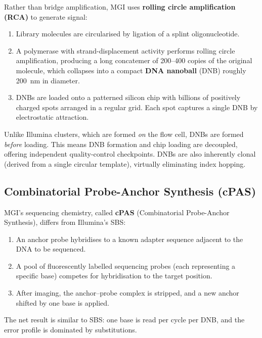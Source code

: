 Rather than bridge amplification, MGI uses \textbf{rolling circle amplification (RCA)} to generate signal:

\begin{enumerate}[nosep]
  \item Library molecules are circularised by ligation of a splint oligonucleotide.
  \item A polymerase with strand-displacement activity performs rolling circle amplification, producing a long concatemer of 200--400 copies of the original molecule, which collapses into a compact \textbf{DNA nanoball} (DNB) roughly 200~nm in diameter.
  \item DNBs are loaded onto a patterned silicon chip with billions of positively charged spots arranged in a regular grid. Each spot captures a single DNB by electrostatic attraction.
\end{enumerate}

\begin{keyconcept}[title={DNA Nanoballs vs Clusters}]
Unlike Illumina clusters, which are formed \emph{on} the flow cell, DNBs are formed \emph{before} loading. This means DNB formation and chip loading are decoupled, offering independent quality-control checkpoints. DNBs are also inherently clonal (derived from a single circular template), virtually eliminating index hopping.
\end{keyconcept}

\subsection{Combinatorial Probe-Anchor Synthesis (cPAS)}

MGI's sequencing chemistry, called \textbf{cPAS} (Combinatorial Probe-Anchor Synthesis), differs from Illumina's \gls{SBS}:

\begin{enumerate}[nosep]
  \item An anchor probe hybridises to a known adapter sequence adjacent to the DNA to be sequenced.
  \item A pool of fluorescently labelled sequencing probes (each representing a specific base) competes for hybridisation to the target position.
  \item After imaging, the anchor--probe complex is stripped, and a new anchor shifted by one base is applied.
\end{enumerate}

The net result is similar to \gls{SBS}: one base is read per cycle per DNB, and the error profile is dominated by substitutions.

